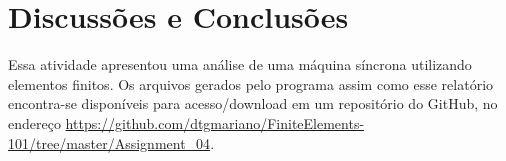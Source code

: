\section{Discussões e Conclusões}
Essa atividade apresentou uma análise de uma máquina síncrona utilizando elementos finitos.
Os arquivos gerados pelo programa assim como esse relatório encontra-se disponíveis para acesso/download em um repositório do GitHub, no endereço \url{https://github.com/dtgmariano/FiniteElements-101/tree/master/Assignment_04}.
